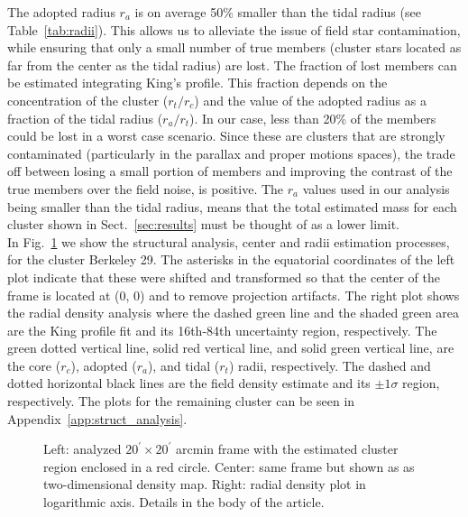 \documentclass[referee]{aa}
\begin{document}
  The adopted radius $r_{a}$ is on average 50\% smaller than the
  tidal radius (see Table~\ref{tab:radii}). This allows us to alleviate the
  issue of field star contamination, while ensuring that only a small number of
  true members (cluster stars located as far from the center as the tidal
  radius) are lost.
  The fraction of lost members can be estimated integrating King's profile. This
  fraction depends on the concentration of the cluster ($r_{t}/r_{c}$) and the
  value of the adopted radius as a fraction of the tidal radius ($r_{a}/r_{t}$).
  In our case, less than 20\% of the members could be lost in a worst case
  scenario. Since these are clusters that are strongly contaminated 
  (particularly in the parallax and proper motions spaces), the trade off
  between losing a small portion of members and improving the contrast of the
  true members over the field noise, is positive.
  The $r_{a}$ values used in our analysis being smaller than the tidal radius,
  means that the total estimated mass for each cluster shown in
  Sect.~\ref{sec:results} must be thought of as a lower limit.\\

  In Fig.~\ref{fig:BER29_struct} we show the structural analysis, center and
  radii estimation processes, for the cluster Berkeley 29. The asterisks in the
  equatorial coordinates of the left plot indicate that these were shifted
  and transformed so that the center of the frame is located at (0, 0) and to
  remove projection artifacts. The right plot shows the radial density analysis
  where the dashed green line and the shaded green area are the King profile fit
  and its 16th-84th uncertainty region, respectively. The green dotted vertical
  line, solid red vertical line, and solid green vertical line, are the core 
  ($r_{c}$), adopted ($r_{a}$), and tidal ($r_{t}$) radii, respectively. The
  dashed and dotted horizontal black lines are the field density estimate and
  its $\pm1\sigma$ region, respectively. The plots for the remaining cluster can
  be seen in Appendix~\ref{app:struct_analysis}.

  \begin{figure}
   \caption{Left: analyzed $20^{\prime} \times 20^{\prime}$ arcmin frame with the
   estimated cluster region enclosed in a red circle. Center: same frame but
   shown as as two-dimensional density map. Right: radial density plot in
   logarithmic axis. Details in the body of the article.}
   \label{fig:BER29_struct}
  \end{figure}
\end{document}
